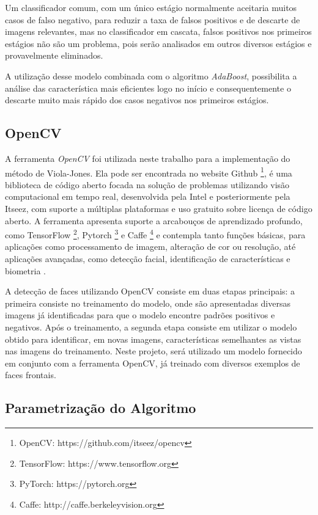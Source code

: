 Um classificador comum, com um único estágio normalmente aceitaria muitos casos de falso negativo, para reduzir a taxa de falsos positivos e de descarte de imagens relevantes, mas no classificador em cascata, falsos positivos nos primeiros estágios não são um problema, pois serão analisados em outros diversos estágios e provavelmente eliminados.

A utilização desse modelo combinada com o algoritmo \textit{AdaBoost}, possibilita a análise das característica mais eficientes logo no início e consequentemente o descarte muito mais rápido dos casos negativos nos primeiros estágios.

\subsection{OpenCV}

A ferramenta \textit{OpenCV} foi utilizada neste trabalho para a implementação do método de Viola-Jones. Ela pode ser encontrada no website Github \footnote{OpenCV: https://github.com/itseez/opencv}, é uma biblioteca de código aberto focada na solução de problemas utilizando visão computacional em tempo real, desenvolvida pela Intel e posteriormente pela Itseez, com suporte a múltiplas plataformas e uso gratuito sobre licença de código aberto. A ferramenta apresenta suporte a arcabouços de aprendizado profundo, como TensorFlow \footnote{TensorFlow: https://www.tensorflow.org}, Pytorch \footnote{PyTorch: https://pytorch.org} e Caffe \footnote{Caffe: http://caffe.berkeleyvision.org} e contempla tanto funções básicas, para aplicações como processamento de imagem, alteração de cor ou resolução, até aplicações avançadas, como detecção facial, identificação de características e biometria \cite{wiki:OpenCV}.

A detecção de faces utilizando OpenCV consiste em duas etapas principais: a primeira consiste no treinamento do modelo, onde são apresentadas diversas imagens já identificadas para que o modelo encontre padrões positivos e negativos. Após o treinamento, a segunda etapa consiste em utilizar o modelo obtido para identificar, em novas imagens, características semelhantes as vistas nas imagens do treinamento. Neste projeto, será utilizado um modelo fornecido em conjunto com a ferramenta OpenCV, já treinado com diversos exemplos de faces frontais.

\subsection{Parametrização do Algoritmo}\label{sec:parametrizacao}

